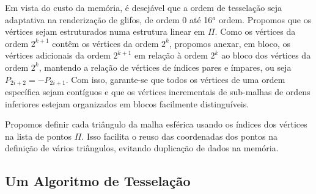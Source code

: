 
Em vista do custo da memória, é desejável que a ordem de tesselação seja adaptativa na renderização de glifos, de ordem 0 até 16$^a$ ordem. Propomos que os vértices sejam estruturados numa estrutura linear em $\Pi$. Como os vértices da ordem $2^{k+1}$ contêm os vértices da ordem $2^{k}$, propomos anexar, em bloco, os vértices adicionais da ordem $2^{k+1}$ em relação à ordem $2^k$ ao bloco dos vértices da ordem $2^k$, mantendo a relação de vértices de índices pares e ímpares, ou seja $P_{2i+2} = -P_{2i+1}$. Com isso, garante-se que todos os vértices de uma ordem específica sejam contíguos e que os vértices incrementais de sub-malhas de ordens inferiores estejam organizados em blocos facilmente distinguíveis.


Propomos definir cada triângulo da malha esférica usando os índices dos vértices na lista de pontos $\Pi$. Isso facilita o reuso das coordenadas dos pontos na definição de vários triângulos, evitando duplicação de dados na memória. %

\subsection{Um Algoritmo de Tesselação}
\label{sssec::formulação_da_geometria_e_estruturação_de_dados}

